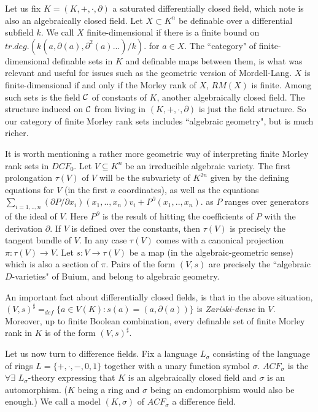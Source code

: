 Let us fix $K =
(K,+,\cdot,\partial)$ a saturated
differentially closed field, which note is
also an algebraically closed field. Let
$X\subset K^{n}$ be definable over a
differential subfield $k$. We call $X$
finite-dimensional if there is a finite bound
on
$tr.deg.(k(a,\partial(a),\partial^{2}(a)...)/k)$.
for $a\in X$. The ``category" of
finite-dimensional definable sets in $K$ and
definable maps between them, is what was
relevant and useful for issues such as the
geometric version of Mordell-Lang. $X$ is
finite-dimensional if and only if the Morley
rank of $X$, $RM(X)$ is finite. Among such
sets is the field ${\cal C}$ of constants of
$K$, another algebraically closed field. The
structure induced on
${\cal C}$ from living
in $(K,+,\cdot,\partial)$ is just the field
structure. So our category of finite Morley
rank sets includes ``algebraic geometry", but
is much richer.

It is worth mentioning a rather more geometric
way of interpreting finite Morley rank sets in
$DCF_{0}$. Let $V\subseteq K^{n}$ be an
irreducible algebraic variety. The first
prolongation $\tau(V)$ of $V$ will be the
subvariety of $K^{2n}$ given by the
defining equations for $V$ (in the first $n$
coordinates), as well as the equations
\newline
$\sum_{i=1,..,n}(\partial
P/\partial x_{i})(x_{1},..,x_{n})v_{i} +
P^{\partial}(x_{1},..,x_{n})$.
\newline
as $P$ ranges over generators of the ideal of
$V$.
\newline
Here $P^{\partial}$ is the result of hitting
the coefficients of $P$ with the derivation
$\partial$.
\newline
If $V$ is defined over the constants, then
$\tau(V)$ is precisely the tangent bundle of
$V$. In any case $\tau(V)$ comes with a
canonical projection $\pi:\tau(V)\rightarrow
V$. Let $s:V\rightarrow \tau(V)$ be a map (in
the algebraic-geometric sense) which is also a
section of $\pi$. Pairs of the form $(V,s)$
are precisely the ``algebraic $D$-varieties" of
Buium, and belong to algebraic geometry.

An important fact about differentially closed
fields, is that in the above situation,
$(V,s)^{\sharp} =_{def} \{a\in V(K): s(a) =
(a,\partial(a))\}$ is {\em Zariski-dense} in
$V$. Moreover, up to finite Boolean
combination, every definable set of finite
Morley rank in $K$ is of the form
$(V,s)^{\sharp}$.

\vspace{5mm}
\noindent
Let us now turn to difference fields. Fix a
language
$L_{\sigma}$ consisting of the language of
rings $L = \{+,\cdot,-,0,1\}$ together with a
unary function symbol $\sigma$.
$ACF_{\sigma}$ is the
$\forall\exists$
$L_{\sigma}$-theory expressing that $K$ is an
algebraically closed field and $\sigma$ is an
automorphism. ($K$ being a ring and $\sigma$
being an endomorphism would also be enough.)
We call a model $(K,\sigma)$ of $ACF_{\sigma}$
a difference field.

